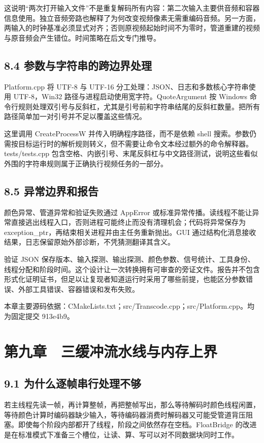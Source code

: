 \documentclass[UTF8,zihao=-4,openany]{ctexbook}
\begin{document}
这说明“两次打开输入文件”不是重复解码所有内容：第二次输入主要供音频和容器信息使用。独立音频旁路也解释了为何改变视频像素无需重编码音频。另一方面，两输入的时钟基准必须显式对齐；否则原视频起始时间不为零时，管道重建的视频与原音频会产生错位。时间策略在后文专门推导。


\section*{8.4 参数与字符串的跨边界处理}
Platform.cpp 将 UTF-8 与 UTF-16 分工处理：JSON、日志和多数核心字符串使用 UTF-8，Win32 路径与进程启动使用宽字符。QuoteArgument 按 Windows 命令行规则处理双引号与反斜杠，尤其是引号前和字符串结尾的反斜杠数量。把所有路径简单加一对引号并不足以覆盖这些情况。

这里调用 CreateProcessW 并传入明确程序路径，而不是依赖 shell 搜索。参数仍需按目标运行时的解析规则转义，但不需要让命令文本经过额外的命令解释器。tests/tests.cpp 包含空格、内嵌引号、末尾反斜杠与中文路径测试，说明这些看似外围的字符串规则属于正确执行视频任务的一部分。


\section*{8.5 异常边界和报告}
颜色异常、管道异常和验证失败通过 AppError 或标准异常传播。读线程不能让异常直接逃出线程入口，否则进程可能终止而没有清理机会；代码将异常保存为 exception\_ptr，再结束相关进程并由主任务重新抛出。GUI 通过结构化消息接收结果，日志保留原始外部诊断，不凭猜测翻译其含义。

验证 JSON 保存版本、输入探测、输出探测、颜色参数、信号统计、工具身份、线程分配和阶段时间。这个设计让一次转换拥有可审查的旁证文件。报告并不包含形式化证明证书，但足以让复现者知道运行时采用了哪些前提，也能区分参数错误、外部工具错误、容器错误和发布失败。


\par\small 本章主要源码依据：CMakeLists.txt；src/Transcode.cpp；src/Platform.cpp。均为固定提交 913e4b9。\normalsize

\chapter*{第九章　三缓冲流水线与内存上界}

\section*{9.1 为什么逐帧串行处理不够}
若主线程先读一帧，再计算整帧，再把整帧写出，那么等待解码时颜色线程闲置，等待颜色计算时编码器缺少输入，等待编码器消费时解码器又可能受管道背压阻塞。即使每个阶段内部都开了线程，阶段之间依然存在空档。FloatBridge 的改进是在标准模式下准备三个槽位，让读、算、写可以对不同数据块同时工作。
\end{document}
